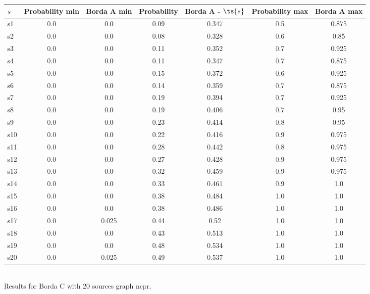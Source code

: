\documentclass{article}
\begin{document}
\noindent\begin{tabular}{|l|c|c|c|c|c|c|}
\hline
$s$& Probability min & Borda A min & Probability & Borda A - $\ts{s}$ & Probability max & Borda A max\\
\hline
s1 &0.0 & 0.0 & 0.09 & 0.347 & 0.5 & 0.875\\
\hline
s2 &0.0 & 0.0 & 0.08 & 0.328 & 0.6 & 0.85\\
\hline
s3 &0.0 & 0.0 & 0.11 & 0.352 & 0.7 & 0.925\\
\hline
s4 &0.0 & 0.0 & 0.11 & 0.347 & 0.7 & 0.875\\
\hline
s5 &0.0 & 0.0 & 0.15 & 0.372 & 0.6 & 0.925\\
\hline
s6 &0.0 & 0.0 & 0.14 & 0.359 & 0.7 & 0.875\\
\hline
s7 &0.0 & 0.0 & 0.19 & 0.394 & 0.7 & 0.925\\
\hline
s8 &0.0 & 0.0 & 0.19 & 0.406 & 0.7 & 0.95\\
\hline
s9 &0.0 & 0.0 & 0.23 & 0.414 & 0.8 & 0.95\\
\hline
s10 &0.0 & 0.0 & 0.22 & 0.416 & 0.9 & 0.975\\
\hline
s11 &0.0 & 0.0 & 0.28 & 0.442 & 0.8 & 0.975\\
\hline
s12 &0.0 & 0.0 & 0.27 & 0.428 & 0.9 & 0.975\\
\hline
s13 &0.0 & 0.0 & 0.32 & 0.459 & 0.9 & 0.975\\
\hline
s14 &0.0 & 0.0 & 0.33 & 0.461 & 0.9 & 1.0\\
\hline
s15 &0.0 & 0.0 & 0.38 & 0.484 & 1.0 & 1.0\\
\hline
s16 &0.0 & 0.0 & 0.38 & 0.486 & 1.0 & 1.0\\
\hline
s17 &0.0 & 0.025 & 0.44 & 0.52 & 1.0 & 1.0\\
\hline
s18 &0.0 & 0.0 & 0.43 & 0.513 & 1.0 & 1.0\\
\hline
s19 &0.0 & 0.0 & 0.48 & 0.534 & 1.0 & 1.0\\
\hline
s20 &0.0 & 0.025 & 0.49 & 0.537 & 1.0 & 1.0\\
\hline
\end{tabular}\\

\noindent Results for Borda C with 20 sources graph ncpr.
\end{document}
